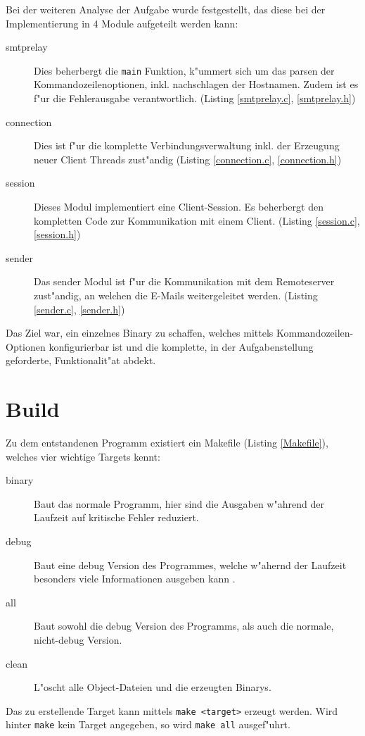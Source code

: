 \documentclass[pdftex,final,a4paper,10pt,notitlepage,halfparskip]{scrreprt}
\begin{document}
Bei der weiteren Analyse der Aufgabe wurde festgestellt, das diese bei der Implementierung in 4 Module aufgeteilt werden kann:
\begin{description}
  \item[smtprelay]
    Dies beherbergt die \texttt{main} Funktion, k"{u}mmert sich um das parsen der Kommandozeilenoptionen, inkl. nachschlagen der Hostnamen. Zudem ist es f"{u}r die Fehlerausgabe verantwortlich. (Listing \ref{smtprelay.c}, \ref{smtprelay.h}) 
  \item[connection] 
    Dies ist f"{u}r die komplette Verbindungsverwaltung inkl. der Erzeugung neuer Client Threads zust"{a}ndig (Listing \ref{connection.c}, \ref{connection.h})
  \item[session] 
    Dieses Modul implementiert eine Client-Session. Es beherbergt den kompletten Code zur Kommunikation mit einem Client. (Listing \ref{session.c}, \ref{session.h})
  \item[sender] 
    Das sender Modul ist f"{u}r die Kommunikation mit dem Remoteserver zust"{a}ndig, an welchen die E-Mails weitergeleitet werden. (Listing \ref{sender.c}, \ref{sender.h})
\end{description}

Das Ziel war, ein einzelnes Binary zu schaffen, welches mittels Kommandozeilen-Optionen konfigurierbar ist und die komplette, in der Aufgabenstellung geforderte, Funktionalit"{a}t abdekt.

\section{Build}\label{build}
Zu dem entstandenen Programm existiert ein Makefile (Listing \ref{Makefile}), welches vier wichtige Targets kennt:
\begin{description}
  \item[binary] Baut das normale Programm, hier sind die Ausgaben w"{a}hrend der Laufzeit auf kritische Fehler reduziert. 
  \item[debug] Baut eine debug Version des Programmes, welche w"{a}hernd der Laufzeit besonders viele Informationen ausgeben kann .
  \item[all] Baut sowohl die debug Version des Programms, als auch die normale, nicht-debug Version.
  \item[clean] L"{o}scht alle Object-Dateien und die erzeugten Binarys. 
\end{description}
Das zu erstellende Target kann mittels \texttt{make <target>} erzeugt werden. Wird hinter \texttt{make} kein Target angegeben, so wird \texttt{make all} ausgef"{u}hrt.
\end{document}
